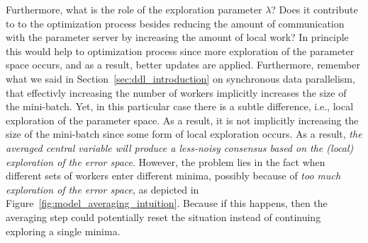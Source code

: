 Furthermore, what is the role of the exploration parameter $\lambda$? Does it contribute to to the optimization process besides reducing the amount of communication with the parameter server by increasing the amount of local work? In principle this would help to optimization process since more exploration of the parameter space occurs, and as a result, better updates are applied. Furthermore, remember what we said in Section~\ref{sec:ddl_introduction} on synchronous data parallelism, that effectivly increasing the number of workers implicitly increases the size of the mini-batch. Yet, in this particular case there is a subtle difference, i.e., local exploration of the parameter space. As a result, it is not implicitly increasing the size of the mini-batch since some form of local exploration occurs. As a result, \emph{the averaged central variable will produce a less-noisy consensus based on the (local) exploration of the error space}.  However, the problem lies in the fact when different sets of workers enter different minima, possibly because of \emph{too much exploration of the error space}, as depicted in Figure~\ref{fig:model_averaging_intuition}. Because if this happens, then the averaging step could potentially reset the situation instead of continuing exploring a single minima.

